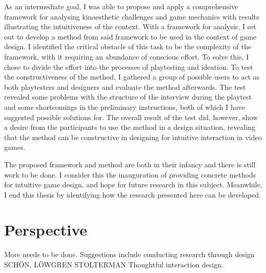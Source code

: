 As an intermediate goal, I was able to propose and apply a comprehensive framework for analysing kinaesthetic challenges and game mechanics with results illustrating the intuitiveness of the context. With a framework for analysis, I set out to develop a method from said framework to be used in the context of game design. I identified the critical obstacle of this task to be the complexity of the framework, with it requiring an abundance of conscious effort. To solve this, I chose to divide the effort into the processes of playtesting and ideation. To test the constructiveness of the method, I gathered a group of possible users to act as both playtesters and designers and evaluate the method afterwards. The test revealed some problems with the structure of the interview during the playtest and some shortcomings in the preliminary instructions, both of which I have suggested possible solutions for. The overall result of the test did, however, show a desire from the participants to use the method in a design situation, revealing that the method can be constructive in designing for intuitive interaction in video games.

The proposed framework and method are both in their infancy and there is still work to be done. I consider this the inauguration of providing concrete methods for intuitive game design, and hope for future research in this subject. Meanwhile, I end this thesis by identifying how the research presented here can be developed.

\section{Perspective}


More needs to be done. Suggestions include conducting research through design SCHÖN, LÖWGREN STOLTERMAN Thoughtful interaction design.
